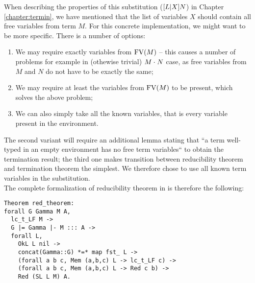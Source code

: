 When describing the properties of this substitution ($\mbox{$ [L | X] N$}$) in Chapter \ref{chapter:termin}, we have mentioned that the list of variables $X$ should contain all free variables from term $M$. For this concrete implementation, we might want to be more specific. There is a number of options:
\begin{enumerate}
\item We may require exactly variables from $\mbox{$\operatorname{FV}({M})$}$ -- this causes a number of problems for example in (othewise trivial) $\mbox{$M \cdot_{} N$}$ case, as free variables from $M$ and $N$ do not have to be exactly the same;
\item We may require at least the variables from $\mbox{$\operatorname{FV}({M})$}$ to be present, which solves the above problem;
\item We can also simply take all the known variables, that is every variable present in the environment.
\end{enumerate}
The second variant will require an additional lemma stating that ``a term well-typed in an empty environment has no free term variables`` to obtain the termination result; the third one makes transition between reducibility theorem and termination theorem the simplest. We therefore chose to use all known term variables in the substitution.\\

The complete formalization of reducibility theorem in \langHyb{} is therefore the following:
\begin{verbatim}
Theorem red_theorem:
forall G Gamma M A,
  lc_t_LF M ->
  G |= Gamma |- M ::: A ->
  forall L,
    OkL L nil ->
    concat(Gamma::G) *=* map fst_ L ->
    (forall a b c, Mem (a,b,c) L -> lc_t_LF c) ->
    (forall a b c, Mem (a,b,c) L -> Red c b) ->
    Red (SL L M) A.
\end{verbatim}

